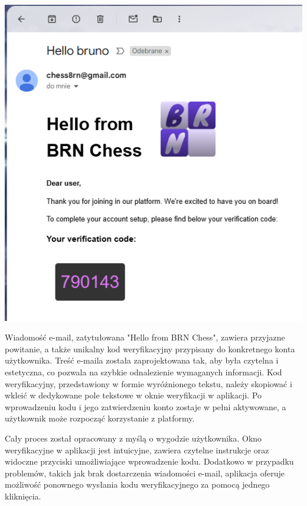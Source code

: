 \documentclass[twoside]{projektInzynierskiMS1}
\begin{document}
\noindent
\begin{minipage}[t]{0.35\textwidth} 
    \vspace{0pt} 
    \centering 
    \includegraphics[width=\linewidth]{images/ins_min_mail.png} 
\end{minipage} 
\hfill 
\begin{minipage}[t]{0.55\textwidth} 
    \vspace{0pt} 
    \justifying 
    \noindent 
    Wiadomość e-mail, zatytułowana "Hello from BRN Chess", zawiera przyjazne powitanie, a także unikalny kod weryfikacyjny przypisany do konkretnego konta użytkownika. Treść e-maila została zaprojektowana tak, aby była czytelna i estetyczna, co pozwala na szybkie odnalezienie wymaganych informacji. Kod weryfikacyjny, przedstawiony w formie wyróżnionego tekstu, należy skopiować i wkleić w dedykowane pole tekstowe w oknie weryfikacji w aplikacji. Po wprowadzeniu kodu i jego zatwierdzeniu konto zostaje w pełni aktywowane, a użytkownik może rozpocząć korzystanie z platformy. 
\end{minipage}

\vspace{1cm}

\noindent
Cały proces został opracowany z myślą o wygodzie użytkownika. Okno weryfikacyjne w aplikacji jest intuicyjne, zawiera czytelne instrukcje oraz widoczne przyciski umożliwiające wprowadzenie kodu. Dodatkowo w przypadku problemów, takich jak brak dostarczenia wiadomości e-mail, aplikacja oferuje możliwość ponownego wysłania kodu weryfikacyjnego za pomocą jednego kliknięcia.
\end{document}
